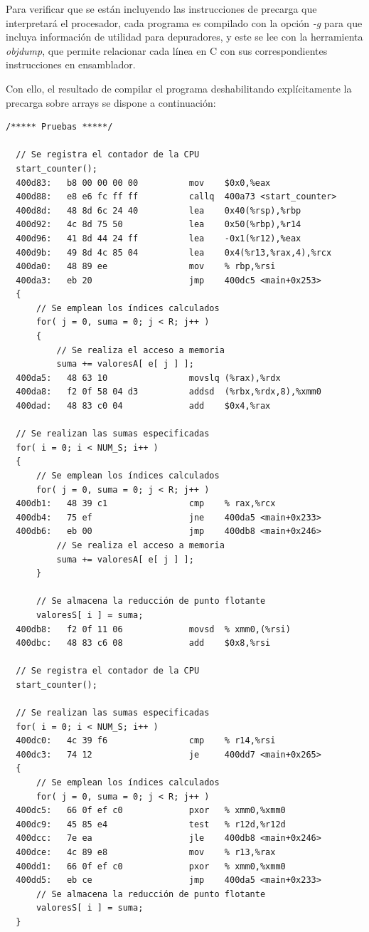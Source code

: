 \documentclass[conference]{IEEEtran}
\begin{document}
Para verificar que se están incluyendo las instrucciones de precarga que interpretará el procesador, cada programa es compilado con la opción \textit{-g} para que incluya información de utilidad para depuradores, y este se lee con la herramienta \textit{objdump}, que permite relacionar cada línea en C con sus correspondientes instrucciones en ensamblador.

Con ello, el resultado de compilar el programa deshabilitando explícitamente la precarga sobre arrays se dispone a continuación:

\begin{lstlisting}[style=customasm, basicstyle=\scriptsize, title=Traducción a ensamblador del bucle computacional del programa de pruebas sin incluir la precarga mediante software.]
/***** Pruebas *****/

  // Se registra el contador de la CPU
  start_counter();
  400d83:	b8 00 00 00 00       	mov    $0x0,%eax
  400d88:	e8 e6 fc ff ff       	callq  400a73 <start_counter>
  400d8d:	48 8d 6c 24 40       	lea    0x40(%rsp),%rbp
  400d92:	4c 8d 75 50          	lea    0x50(%rbp),%r14
  400d96:	41 8d 44 24 ff       	lea    -0x1(%r12),%eax
  400d9b:	49 8d 4c 85 04       	lea    0x4(%r13,%rax,4),%rcx
  400da0:	48 89 ee             	mov    % rbp,%rsi
  400da3:	eb 20                	jmp    400dc5 <main+0x253>
  {
      // Se emplean los índices calculados
      for( j = 0, suma = 0; j < R; j++ )
      {
          // Se realiza el acceso a memoria
          suma += valoresA[ e[ j ] ];
  400da5:	48 63 10             	movslq (%rax),%rdx
  400da8:	f2 0f 58 04 d3       	addsd  (%rbx,%rdx,8),%xmm0
  400dad:	48 83 c0 04          	add    $0x4,%rax

  // Se realizan las sumas especificadas
  for( i = 0; i < NUM_S; i++ )
  {
      // Se emplean los índices calculados
      for( j = 0, suma = 0; j < R; j++ )
  400db1:	48 39 c1             	cmp    % rax,%rcx
  400db4:	75 ef                	jne    400da5 <main+0x233>
  400db6:	eb 00                	jmp    400db8 <main+0x246>
          // Se realiza el acceso a memoria
          suma += valoresA[ e[ j ] ];
      }

      // Se almacena la reducción de punto flotante
      valoresS[ i ] = suma;
  400db8:	f2 0f 11 06          	movsd  % xmm0,(%rsi)
  400dbc:	48 83 c6 08          	add    $0x8,%rsi

  // Se registra el contador de la CPU
  start_counter();

  // Se realizan las sumas especificadas
  for( i = 0; i < NUM_S; i++ )
  400dc0:	4c 39 f6             	cmp    % r14,%rsi
  400dc3:	74 12                	je     400dd7 <main+0x265>
  {
      // Se emplean los índices calculados
      for( j = 0, suma = 0; j < R; j++ )
  400dc5:	66 0f ef c0          	pxor   % xmm0,%xmm0
  400dc9:	45 85 e4             	test   % r12d,%r12d
  400dcc:	7e ea                	jle    400db8 <main+0x246>
  400dce:	4c 89 e8             	mov    % r13,%rax
  400dd1:	66 0f ef c0          	pxor   % xmm0,%xmm0
  400dd5:	eb ce                	jmp    400da5 <main+0x233>
      // Se almacena la reducción de punto flotante
      valoresS[ i ] = suma;
  }


\end{lstlisting}
\end{document}
